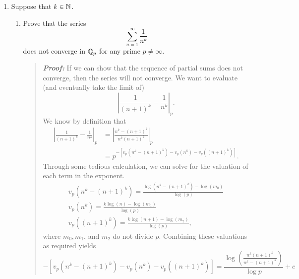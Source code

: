 \documentclass{hw}
\begin{document}
\begin{enumerate}
	\item Suppose that $k\in\mathbb{N}$.
	      \begin{enumerate}
	      	\item Prove that the series
	      	      \[
	      	      	\sum_{n=1}^{\infty}\frac{1}{n^{k}}
	      	      \]
	      	      does not converge in $\mathbb{Q}_{p}$ for any prime $p\neq\infty$.
	      	      \begin{quote}
	      	      	\textit{\textbf{Proof:}} If we can show that the sequence of partial sums does not converge, then the series will not converge. We want to evaluate (and eventually take the limit of)
	      	      	\[
	      	      		\left|
	      	      		\frac{1}{(n+1)^{k}}-\frac{1}{n^{k}}
	      	      		\right|_{p}.
	      	      	\]
	      	      	We know by definition that
	      	      	\begin{align*}
	      	      		\left|
	      	      		\frac{1}{(n+1)^{k}}-\frac{1}{n^{k}}
	      	      		\right|_{p} & =
	      	      		\left|
	      	      		\frac{n^{k}-(n+1)^{k}}{n^{k}(n+1)^{k}}
	      	      		\right|_{p}\\
	      	      		            & = p^{-
	      	      		\left[
	      	      		v_{p}(n^{k}-(n+1)^{k}) - v_{p}(n^{k})-v_{p}((n+1)^{k})
	      	      		\right]
	      	      		}.
	      	      	\end{align*}
	      	      	Through some tedious calculation, we can solve for the valuation of each term in the exponent.
	      	      	\begin{gather*}
	      	      		v_{p}\left(n^k-(n+1)^k\right) =
	      	      		\frac{
	      	      			\log{(n^k-(n+1)^k) - \log(m_{0})}
	      	      			}{
	      	      			\log{(p)}
	      	      			}\\
	      	      		v_{p}(n^{k}) =
	      	      		\frac{
	      	      			k\log{(n)}-\log{(m_{1})}
	      	      			}{\log{(p)}}\\
	      	      		v_{p}((n+1)^k) =
	      	      		\frac{
	      	      			k\log{(n+1)}-\log{(m_{2})}
	      	      			}{
	      	      			\log{(p)}
	      	      		},
	      	      	\end{gather*}
	      	      	where $m_{0},m_{1}$, and $m_{2}$ do not divide $p$. Combining these valuations as required yields
	      	      	\[
	      	      		-\left[v_{p}(n^{k}-(n+1)^{k}) - v_{p}(n^{k})-v_{p}((n+1)^{k})\right]=
	      	      		\frac{
	      	      			\log{\left(
	      	      				\frac{n^{k}(n+1)^{k}}{n^k-(n+1)^k}
	      	      				\right)}
	      	      			}{
	      	      			\log{p}
	      	      		} + c
\]
\end{quote}
\end{enumerate}
\end{enumerate}
\end{document}
